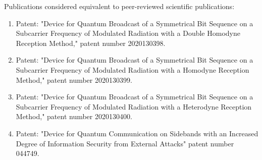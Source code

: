 Publications considered equivalent to peer-reviewed scientific publications:

\begin{enumerate}

\item Patent: "Device for Quantum Broadcast of a Symmetrical Bit Sequence on a Subcarrier Frequency of Modulated Radiation with a Double Homodyne Reception Method," patent number 2020130398.
\item Patent: "Device for Quantum Broadcast of a Symmetrical Bit Sequence on a Subcarrier Frequency of Modulated Radiation with a Homodyne Reception Method," patent number 2020130399.
\item Patent: "Device for Quantum Broadcast of a Symmetrical Bit Sequence on a Subcarrier Frequency of Modulated Radiation with a Heterodyne Reception Method," patent number 2020130400.
\item Patent: "Device for Quantum Communication on Sidebands with an Increased Degree of Information Security from External Attacks" patent number 044749.

\end{enumerate}

